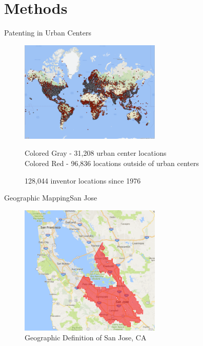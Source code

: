 \documentclass{beamer}
\begin{document}
\section{Methods}

\begin{frame}{Patenting in Urban Centers}{}
\begin{figure}[h!]
\begin{centering}
  \includegraphics[width=0.6\textwidth]{World}
  \caption{128,044 inventor locations since 1976}
   Colored Gray - 31,208 urban center locations \\
   Colored Red - 96,836 locations outside of urban centers
   \label{fig:World}
\end{centering}
\end{figure}
\end{frame}

\begin{frame}{Geographic Mapping}{San Jose}
\begin{figure}[h!]
\begin{centering}
  \includegraphics[width=0.6\textwidth]{SanJose}
  \caption{Geographic Definition of San Jose, CA}
   \label{fig:SanJose}
\end{centering}
\end{figure}
\end{frame}
\end{document}
